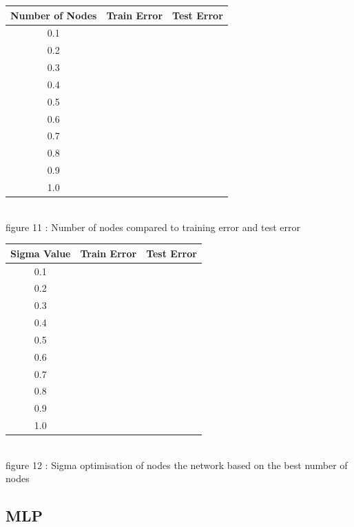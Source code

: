 \documentclass{IEEEtran}[11pt]
\begin{document}
\begin{center}
\begin{tabular}{||c c c||}
  \hline
Number of Nodes & Train Error & Test Error \\ [0.5ex]
\hline
0.1 \\
0.2 \\
0.3 \\
0.4 \\
0.5 \\
0.6 \\
0.7 \\
0.8 \\
0.9 \\
1.0 \\
\end{tabular}
\\
\vspace{2.5mm}
{\footnotesize figure 11 : Number of nodes compared to training error and
test error}
\end{center}
\begin{center}
\begin{tabular}{||c c c||}
  \hline
Sigma Value & Train Error & Test Error \\ [0.5ex]
\hline
0.1 \\
0.2 \\
0.3 \\
0.4 \\
0.5 \\
0.6 \\
0.7 \\
0.8 \\
0.9 \\
1.0 \\
\hline
\end{tabular}
\\
\vspace{2.5mm}
{\footnotesize figure 12 : Sigma optimisation of nodes the network based on the
best number of nodes}
\end{center}
\subsection{MLP}
\end{document}
